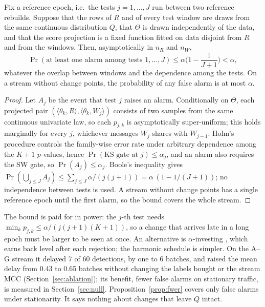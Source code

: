 \begin{proposition}\label{prop:fwer}
Fix a reference epoch, i.e.\ the tests $j=1,\dots,J$ run between two reference rebuilds. Suppose that the rows of $R$ and of every test window are draws from the same continuous distribution $Q$, that $\Theta$ is drawn independently of the data, and that the score projection is a fixed function fitted on data disjoint from $R$ and from the windows. Then, asymptotically in $n_R$ and $n_W$,
\[
\Pr(\text{at least one alarm among tests }1,\dots,J)\le\alpha\Big(1-\frac{1}{J+1}\Big)<\alpha ,
\]
whatever the overlap between windows and the dependence among the tests. On a stream without change points, the probability of any false alarm is at most $\alpha$.
\end{proposition}
\begin{proof}
Let $A_j$ be the event that test $j$ raises an alarm. Conditionally on $\Theta$, each projected pair $(\langle\theta_k,R\rangle,\langle\theta_k,W_j\rangle)$ consists of two samples from the same continuous univariate law, so each $p_{j,k}$ is asymptotically super-uniform; this holds marginally for every $j$, whichever messages $W_j$ shares with $W_{j-1}$. Holm's procedure controls the family-wise error rate under arbitrary dependence among the $K+1$ $p$-values, hence $\Pr(\text{KS gate at }j)\le\alpha_j$, and an alarm also requires the SW gate, so $\Pr(A_j)\le\alpha_j$. Boole's inequality gives $\Pr(\bigcup_{j\le J}A_j)\le\sum_{j\le J}\alpha/(j(j+1))=\alpha\,(1-1/(J+1))$; no independence between tests is used. A stream without change points has a single reference epoch until the first alarm, so the bound covers the whole stream.
\end{proof}

The bound is paid for in power: the $j$-th test needs $\min_k p_{j,k}\le\alpha/(j(j+1)(K+1))$, so a change that arrives late in a long epoch must be larger to be seen at once. An alternative is $\alpha$-investing \cite{foster2008}, which earns back level after each rejection; the harmonic schedule is simpler. On the A--G stream it delayed 7 of 60 detections, by one to 6 batches, and raised the mean delay from 0.43 to 0.65 batches without changing the labels bought or the stream MCC (Section~\ref{sec:ablation}); its benefit, fewer false alarms on stationary traffic, is measured in Section~\ref{sec:null}. Proposition~\ref{prop:fwer} covers only false alarms under stationarity. It says nothing about changes that leave $Q$ intact.

